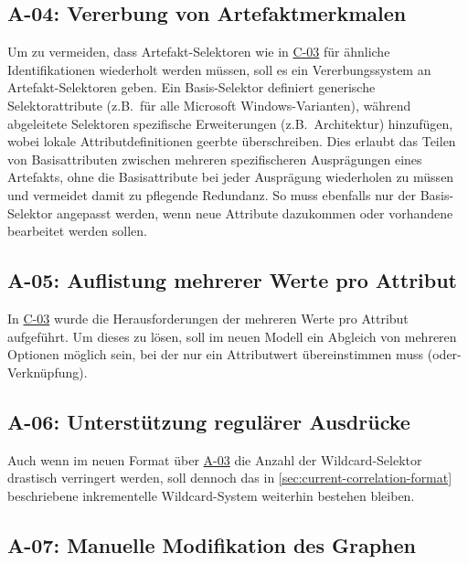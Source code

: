 \subsection{A-04: Vererbung von Artefaktmerkmalen}\label{subsec:req-Selektor-inheritance}

Um zu vermeiden, dass Artefakt-Selektoren wie in \hyperref[subsec:c-03-duplizierte-artefakt-selektoren]{C-03} für ähnliche Identifikationen wiederholt werden müssen, soll es ein Vererbungssystem an Artefakt-Selektoren geben.
Ein Basis-Selektor definiert generische Selektorattribute (z.B.\ für alle Microsoft Windows-Varianten), während abgeleitete Selektoren spezifische Erweiterungen (z.B.\ Architektur) hinzufügen, wobei lokale Attributdefinitionen geerbte überschreiben.
Dies erlaubt das Teilen von Basisattributen zwischen mehreren spezifischeren Ausprägungen eines Artefakts, ohne die Basisattribute bei jeder Ausprägung wiederholen zu müssen und vermeidet damit zu pflegende Redundanz.
So muss ebenfalls nur der Basis-Selektor angepasst werden, wenn neue Attribute dazukommen oder vorhandene bearbeitet werden sollen.

\subsection{A-05: Auflistung mehrerer Werte pro Attribut}\label{subsec:req-multiple-attribute-values}

In \hyperref[subsec:c-03-duplizierte-artefakt-selektoren]{C-03} wurde die Herausforderungen der mehreren Werte pro Attribut aufgeführt.
Um dieses zu lösen, soll im neuen Modell ein Abgleich von mehreren Optionen möglich sein, bei der nur ein Attributwert übereinstimmen muss (oder-Verknüpfung).

\subsection{A-06: Unterstützung regulärer Ausdrücke}\label{subsec:req-regex-support}

Auch wenn im neuen Format über \hyperref[subsec:req-type-specific-matching]{A-03} die Anzahl der Wildcard-Selektor drastisch verringert werden, soll dennoch das in \autoref{sec:current-correlation-format} beschriebene inkrementelle Wildcard-System weiterhin bestehen bleiben.

\subsection{A-07: Manuelle Modifikation des Graphen}\label{subsec:req-manual-format-modification}

